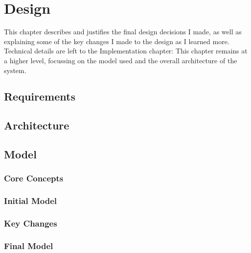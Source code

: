 \chapter{Design}
  This chapter describes and justifies the final design decisions I made, as well as explaining some of the key changes I made to the design as I learned more. Technical details are left to the Implementation chapter: This chapter remains at a higher level, focussing on the model used and the overall architecture of the system.

  \section{Requirements}
  \section{Architecture}
  \section{Model}
    \subsection{Core Concepts}
    \subsection{Initial Model}
    \subsection{Key Changes}
    \subsection{Final Model}
